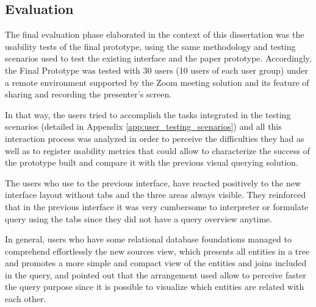 \subsection{Evaluation}
\label{subsec:service_studio_evaluation}

The final evaluation phase elaborated in the context of this dissertation was the usability tests of the final prototype, using the same methodology and testing scenarios used to test the existing interface and the paper prototype. Accordingly, the Final Prototype was tested with 30 users (10 users of each user group) under a remote environment supported by the Zoom \cite{zoom} meeting solution and its feature of sharing and recording the presenter's screen.

In that way, the users tried to accomplish the tasks integrated in the testing scenarios (detailed in Appendix \ref{app:user_testing_scenarios}) and all this interaction process was analyzed in order to perceive the difficulties they had as well as to register usability metrics that could allow to characterize the success of the prototype built and compare it with the previous visual querying solution.


The users who use to the previous interface, have reacted positively to the new interface layout without tabs and the three areas always visible. They reinforced that in the previous interface it was very cumbersome to interpreter or formulate query using the tabs since they did not have a query overview anytime.


In general, users who have some relational database foundations managed to comprehend effortlessly the new sources view, which presents all entities in a tree and promotes a more simple and compact view of the entities and joins included in the query, and pointed out that the arrangement used allow to perceive faster the query purpose since it is possible to visualize which entities are related with each other.

